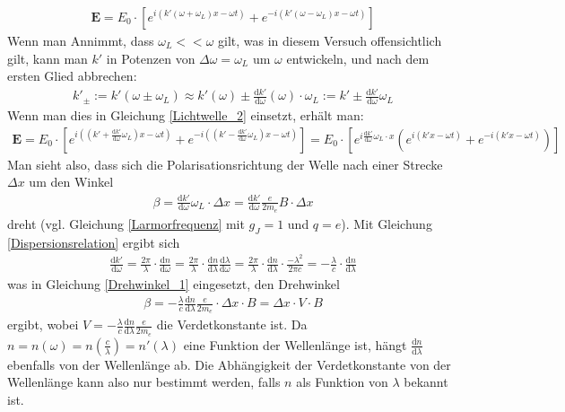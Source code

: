 \documentclass[12pt,a4paper]{article}
\begin{document}
\begin{align}
\textbf{E} = E_0\cdot[e^{i(k'(\omega + \omega_L) x - \omega t)}+e^{-i(k'(\omega - \omega_L) x - \omega t)}]
\label{Lichtwelle_2}
\end{align}
Wenn man Annimmt, dass $\omega_L << \omega$ gilt, was in diesem Versuch offensichtlich gilt, kann man $k'$ in Potenzen von $\Delta \omega = \omega_L$
um $\omega$ entwickeln, und nach dem ersten Glied abbrechen:
\begin{align*}
k'_{\pm} := k'(\omega \pm \omega_L) \approx k'(\omega) \pm \frac{\text{d} k'}{\text{d} \omega}(\omega)\cdot\omega_L := k' \pm \frac{\text{d}k'}{\text{d}\omega}\omega_L
\end{align*}
Wenn man dies in Gleichung \ref{Lichtwelle_2} einsetzt, erhält man:
\begin{align}
\textbf{E} = E_0\cdot[e^{i((k'+ \frac{\text{d} k'}{\text{d} \omega}\omega_L) x - \omega t)}+e^{-i((k' - \frac{\text{d} k'}{\text{d} \omega}\omega_L) x - \omega t)}] = E_0\cdot[e^{i\frac{\text{d} k'}{\text{d} \omega}\omega_L \cdot x}(e^{i(k' x - \omega t)}+e^{-i(k' x - \omega t)})]
\label{Lichtwelle_3}
\end{align}
Man sieht also, dass sich die Polarisationsrichtung der Welle nach einer Strecke $\Delta x$ um den Winkel
\begin{align}
\beta = \frac{\text{d} k'}{\text{d} \omega}\omega_L\cdot \Delta x = \frac{\text{d} k'}{\text{d} \omega}\frac{e}{2m_e}B\cdot \Delta x
\label{Drehwinkel_1}
\end{align}
dreht (vgl. Gleichung \ref{Larmorfrequenz} mit $g_J = 1$ und $ q = e $).
Mit Gleichung \ref{Dispersionsrelation} ergibt sich
\begin{align}
\frac{\text{d} k'}{\text{d} \omega} = \frac{2\pi}{\lambda}\cdot\frac{\text{d} n}{\text{d} \omega} = \frac{2\pi}{\lambda}\cdot\frac{\text{d} n}{\text{d} \lambda}\frac{\text{d} \lambda}{\text{d} \omega} = \frac{2\pi}{\lambda}\cdot \frac{\text{d} n}{\text{d} \lambda} \cdot \frac{-\lambda^2}{2\pi c} = -\frac{\lambda}{c} \cdot \frac{\text{d} n}{\text{d} \lambda}
\end{align}
was in Gleichung \ref{Drehwinkel_1} eingesetzt, den Drehwinkel
\begin{align}
\beta = -\frac{\lambda}{c} \frac{\text{d} n}{\text{d} \lambda}\frac{e}{2m_e}\cdot\Delta x\cdot B = \Delta x \cdot V \cdot B
\label{Drehwinkel_2}
\end{align}
ergibt, wobei $V =  -\frac{\lambda}{c} \frac{\text{d} n}{\text{d} \lambda}\frac{e}{2m_e}$ die Verdetkonstante ist. Da $n = n(\omega) = n(\frac{c}{\lambda}) = n'(\lambda)$ eine Funktion der Wellenlänge ist, hängt $\frac{\text{d} n}{\text{d} \lambda}$ ebenfalls von der Wellenlänge ab. Die Abhängigkeit der Verdetkonstante von der Wellenlänge kann also nur bestimmt werden, falls $n$ als Funktion von $\lambda$ bekannt ist.
\end{document}
